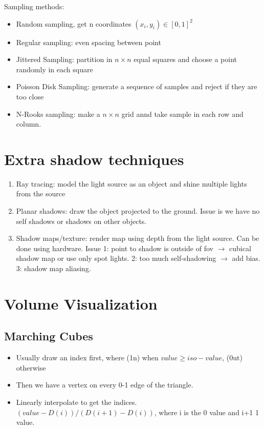 \documentclass[a4paper]{article}
\begin{document}
Sampling methods:
\begin{itemize}
    \item Random sampling, get n coordinates $(x_i, y_i) \in [0,1]^2$ 
    \item Regular sampling: even spacing between point 
    \item Jittered Sampling: partition in $n\times n$ equal squares and choose a point randomly in each square
    \item Poisson Disk Sampling: generate a sequence of samples and reject if they are too close
    \item N-Rooks sampling: make a $n\times n$ grid annd take sample in each row and column.  
\end{itemize}

\section{Extra shadow techniques}
\begin{enumerate}
    \item Ray tracing: model the light source as an object and shine multiple lights from the source
    \item Planar shadows: draw the object projected to the ground. Issue is we have no self shadows or shadows on other objects.
    \item Shadow maps/texture: render map using depth from the light source. Can be done using hardware. Issue 1: point to shadow is outside of fov $\to$ cubical shadow map or use only spot lights. 2: too much self-shadowing $ \to$ add bias. 3: shadow map aliasing.  
\end{enumerate}


\section{Volume Visualization}
\subsection*{Marching Cubes}
\begin{itemize}
    \item Usually draw an index first, where (1n) when $value \geq iso-value$, (0ut) otherwise 
    \item Then we have a vertex on every 0-1 edge of the triangle.
    \item Linearly interpolate to get the indices. $(value - D(i)) / (D(i+1) - D(i))$, where i is the 0 value and i+1 1 value.  
\end{itemize}
\end{document}
